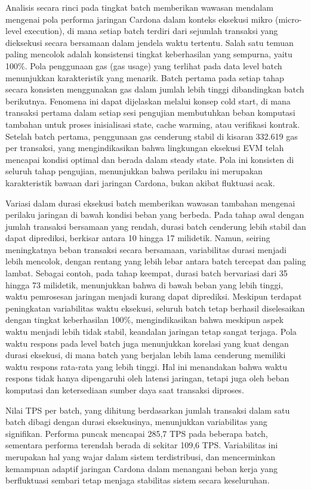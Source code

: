 Analisis secara rinci pada tingkat batch memberikan wawasan mendalam mengenai
pola performa jaringan Cardona dalam konteks eksekusi mikro (micro-level
execution), di mana setiap batch terdiri dari sejumlah transaksi yang
dieksekusi secara bersamaan dalam jendela waktu tertentu. Salah satu temuan
paling mencolok adalah konsistensi tingkat keberhasilan yang sempurna, yaitu
100\%. Pola penggunaan gas (gas usage) yang terlihat pada data level batch
menunjukkan karakteristik yang menarik. Batch pertama pada setiap tahap secara
konsisten menggunakan gas dalam jumlah lebih tinggi dibandingkan batch
berikutnya. Fenomena ini dapat dijelaskan melalui konsep cold start, di mana
transaksi pertama dalam setiap sesi pengujian membutuhkan beban komputasi
tambahan untuk proses inisialisasi state, cache warming, atau verifikasi
kontrak. Setelah batch pertama, penggunaan gas cenderung stabil di kisaran
332.619 gas per transaksi, yang mengindikasikan bahwa lingkungan eksekusi EVM
telah mencapai kondisi optimal dan berada dalam steady state. Pola ini
konsisten di seluruh tahap pengujian, menunjukkan bahwa perilaku ini merupakan
karakteristik bawaan dari jaringan Cardona, bukan akibat fluktuasi acak.

Variasi dalam durasi eksekusi batch memberikan wawasan tambahan mengenai
perilaku jaringan di bawah kondisi beban yang berbeda. Pada tahap awal dengan
jumlah transaksi bersamaan yang rendah, durasi batch cenderung lebih stabil dan
dapat diprediksi, berkisar antara 10 hingga 17 milidetik. Namun, seiring
meningkatnya beban transaksi secara bersamaan, variabilitas durasi menjadi
lebih mencolok, dengan rentang yang lebih lebar antara batch tercepat dan
paling lambat. Sebagai contoh, pada tahap keempat, durasi batch bervariasi dari
35 hingga 73 milidetik, menunjukkan bahwa di bawah beban yang lebih tinggi,
waktu pemrosesan jaringan menjadi kurang dapat diprediksi. Meskipun terdapat
peningkatan variabilitas waktu eksekusi, seluruh batch tetap berhasil
diselesaikan dengan tingkat keberhasilan 100\%, mengindikasikan bahwa meskipun
aspek waktu menjadi lebih tidak stabil, keandalan jaringan tetap sangat
terjaga. Pola waktu respons pada level batch juga menunjukkan korelasi yang
kuat dengan durasi eksekusi, di mana batch yang berjalan lebih lama cenderung
memiliki waktu respons rata-rata yang lebih tinggi. Hal ini menandakan bahwa
waktu respons tidak hanya dipengaruhi oleh latensi jaringan, tetapi juga oleh
beban komputasi dan ketersediaan sumber daya saat transaksi diproses.

Nilai TPS per batch, yang dihitung berdasarkan jumlah transaksi dalam satu
batch dibagi dengan durasi eksekusinya, menunjukkan variabilitas yang
signifikan. Performa puncak mencapai 285,7 TPS pada beberapa batch, sementara
performa terendah berada di sekitar 109,6 TPS. Variabilitas ini merupakan hal
yang wajar dalam sistem terdistribusi, dan mencerminkan kemampuan adaptif
jaringan Cardona dalam menangani beban kerja yang berfluktuasi sembari tetap
menjaga stabilitas sistem secara keseluruhan.

